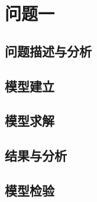 \section{问题一}
\subsection{问题描述与分析}
\subsection{模型建立}
\subsection{模型求解}
\subsection{结果与分析}
\subsection{模型检验}
